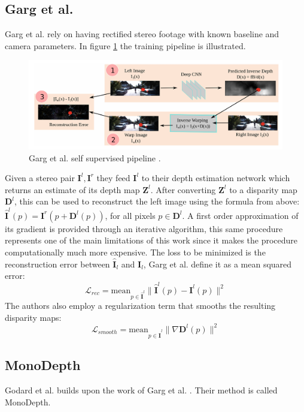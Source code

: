 \subsection{Garg et al.}
Garg et al. \cite{Garg} rely on having rectified stereo footage with known baseline and camera parameters.
In figure \ref{fig:garg} the training pipeline is illustrated.

\begin{figure}
	\centering
	\includegraphics[scale=0.3]{figs/garg}
	\caption{Garg et al. self supervised pipeline \cite{Garg}. \label{fig:garg}}
\end{figure}

Given a stereo pair $\mathbf{I}^{l}, \mathbf{I}^{r}$ they feed $\mathbf{I}^{l}$ to their depth estimation network which returns an estimate of its depth map $\mathbf{Z}^{l}$.
After converting $\mathbf{Z}^{l}$ to a disparity map $\mathbf{D}^{l}$, this can be used to reconstruct the left image using the formula from above: $\hat{\mathbf{I}}^{l} (p) = \mathbf{I}^{r} (p + \mathbf{D}^{l}(p))$, for all pixels $p \in \mathbf{D}^{l}$.
A first order approximation of its gradient is provided through an iterative algorithm, this same procedure represents one of the main limitations of this work since it makes the procedure computationally much more expensive.
The loss to be minimized is the reconstruction error between $\hat{\mathbf{I}}_{l}$ and $\mathbf{I}_{l}$, Garg et al. define it as a mean squared error:
\[
	\mathcal{L}_{rec} = \text{mean}_{p \in \hat{\mathbf{I}}^{l}} \big\| \hat{\mathbf{I}}^{l}(p) - \mathbf{I}^{l}(p) \big\|^{2}
\]
The authors also employ a regularization term that smooths the resulting disparity maps:
\[
	\mathcal{L}_{smooth} = \text{mean}_{p \in \hat{\mathbf{I}}^{l}} \big\| \nabla \mathbf{D}^{l} (p) \big\|^{2}
\]

\subsection{MonoDepth}
Godard et al. \cite{MonoDepth} builds upon the work of Garg et al. \cite{Garg}.
Their method is called MonoDepth.

